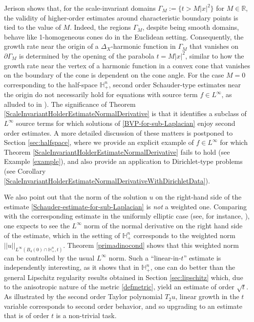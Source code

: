 \documentclass[12pt]{amsart}
\newcommand{\R}{{\mathbb R}}
\def \H {{\mathbb H}}
\begin{document}
Jerison \cite{Jerison81-2} shows that, for the scale-invariant domains $\Gamma_M := \{t>M|x|^2\}$ for $M \in \R$, the validity of higher-order estimates around characteristic boundary points is tied to the value of $M$. Indeed, the regions $\Gamma_M$, despite being smooth domains, behave like 1-homogeneous cones do in the Euclidean setting. Consequently, the growth rate near the origin of a $\Delta_X$-harmonic function in $\Gamma_M$ that vanishes on $\partial \Gamma_M$ is determined by the opening of the parabola $t = M|x|^2$, similar to how the growth rate near the vertex of a harmonic function in a convex cone that vanishes on the boundary of the cone is dependent on the cone angle. For the case $M = 0$ corresponding to the half-space $\H^n_+$, second order Schauder-type estimates near the origin do not necessarily hold for equations with source term $f \in L^{\infty}$, as alluded to in  \cite[Theorems 5.1', 5.2' and discussion at the end of pg. 235]{Jerison81-2}). The significance of Theorem \ref{ScaleInvariantHolderEstimateNormalDerivative} is that it identifies a subclass of $L^{\infty}$ source terms for which solutions of \eqref{BVP-for-sub-Laplacian} enjoy second order estimates. A more detailed discussion of these matters is postponed to Section \ref{sec:halfspace}, where we provide an explicit example of $f\in L^\infty$ for which Theorem \ref{ScaleInvariantHolderEstimateNormalDerivative} fails to hold (see Example \ref{example}), and also provide an application to Dirichlet-type problems (see Corollary \ref{ScaleInvariantHolderEstimateNormalDerivativeWithDirichletData}).

We also point out that the norm of the solution $u$ on the right-hand side of the estimate \eqref{Schauder-estimate-for-sub-Laplacian} is \emph{not} a weighted one. Comparing with the corresponding estimate in the uniformly elliptic case (see, for instance, 
\cite[Theorem 1.2.16]{HanBook}), one expects to see the $L^{\infty}$ norm of the normal derivative on the right hand side of the estimate, which in the setting of $\H^n_+$ corresponds to the weighted norm $||u||_{L^{\infty}(B_{4}(0)\cap \H^n_+, t)}$. Theorem \ref{primadinocond} shows that this weighted norm can be controlled by the usual $L^{\infty}$ norm. Such a ``linear-in-$t$'' estimate is independently interesting, as it shows that in $\H^n_+$, one can do better than the general Lipschitz regularity results obtained in Section \ref{sec:lipschitz} which, due to the anisotropic nature of the metric \eqref{defmetric}, yield an estimate of order $\sqrt{t}$. As illustrated by the second order Taylor polynomial $T_2 u$, linear growth in the $t$ variable corresponds to second order behavior, and so upgrading to an estimate that is of order $t$ is a non-trivial task.
\end{document}
